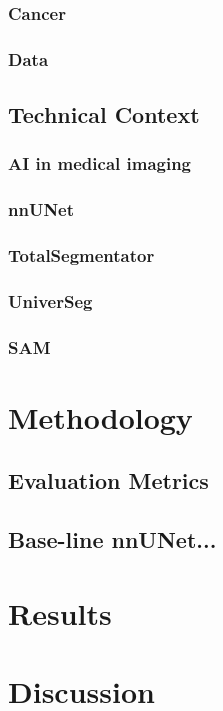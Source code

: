 \documentclass[12pt,twoside]{report}
\begin{document}
\subsection{Cancer}
\subsection{Data}

\section{Technical Context}
\subsection{AI in medical imaging}
\subsection{nnUNet}
\subsection{TotalSegmentator}
\subsection{UniverSeg}
\subsection{SAM}

\chapter{Methodology}

\section{Evaluation Metrics}
\section{Base-line nnUNet...}

\chapter{Results}

\chapter{Discussion}
\end{document}
